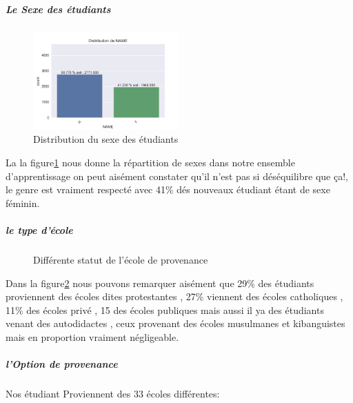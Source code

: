 \subparagraph{Le Sexe des étudiants}
	\begin{figure}[!htbp]
	\centering
	\includegraphics[width=0.5\textwidth]{fig/NAME.png}
	\caption{Distribution du sexe des étudiants }
	\label{fig:SEXE}
\end{figure}
La  la figure\ref{fig:SEXE} nous donne la  répartition de sexes dans notre ensemble d'apprentissage on peut aisément constater qu'il n'est pas si déséquilibre que ça!, le
genre est vraiment respecté avec 41\% dés nouveaux étudiant étant de
sexe féminin.
\subparagraph{le type d'école}
\begin{figure}[!htbp]
	\centering
	\caption{Différente statut de l'école de provenance }
	\label{fig:SchoolStatus}
\end{figure}
 Dans la figure\ref{fig:SchoolStatus} nous pouvons remarquer aisément que 29\% des étudiants
proviennent des écoles dites protestantes , 27\% viennent des écoles
catholiques , 11\% des écoles privé , 15 des écoles publiques mais aussi
il ya des étudiants venant des autodidactes , ceux provenant des écoles
musulmanes et kibanguistes mais en proportion vraiment négligeable.
\subparagraph{l'Option de provenance}
Nos étudiant Proviennent des 33 écoles différentes:

